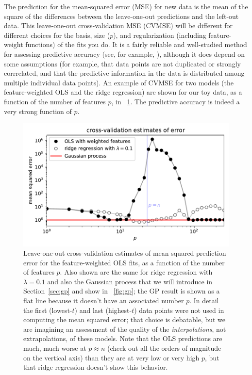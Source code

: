 \documentclass[12pt,letterpaper]{article}
\newlength{\figurewidth}
\newcommand{\sectionname}{Section}
\begin{document}
The prediction for the mean-squared error (MSE) for new data is the mean of the square of the differences between the leave-one-out predictions and the left-out data.
This leave-one-out cross-validation MSE (CVMSE) will be different for different choices for the basis, size ($p$), and regularization (including feature-weight functions) of the fits you do.
It is a fairly reliable and well-studied method for assessing predictive accuracy (see, for example, \citealt{cv}), although it does depend on some assumptions (for example, that data points are not duplicated or strongly corrrelated, and that the predictive information in the data is distributed among multiple individual data points).
An example of CVMSE for two models (the feature-weighted OLS and the ridge regression) are shown for our toy data, as a function of the number of features $p$, in \figurename~\ref{fig:cv}.
The predictive accuracy is indeed a very strong function of $p$.
\begin{figure}[t]
    \begin{mdframed}
    \includegraphics[width=\figurewidth]{paper/cross-validation.pdf}
    \caption{Leave-one-out cross-validation estimates of mean squared prediction error for the feature-weighted OLS fits, as a function of the number of features $p$. Also shown are the same for ridge regression with $\lambda=0.1$ and also the Gaussian process that we will introduce in \sectionname~\ref{sec:gp} and show in \figurename~\ref{fig:gp}; the GP result is shown as a flat line because it doesn't have an associated number $p$. In detail the first (lowest-$t$) and last (highest-$t$) data points were not used in computing the mean squared error; that choice is debatable, but we are imagining an assessment of the quality of the \emph{interpolations}, not extrapolations, of these models. Note that the OLS predictions are much, much worse at $p\approx n$ (check out all the orders of magnitude on the vertical axis) than they are at very low or very high $p$, but that ridge regression doesn't show this behavior.}
    \label{fig:cv}
    \end{mdframed}
\end{figure}
\end{document}
